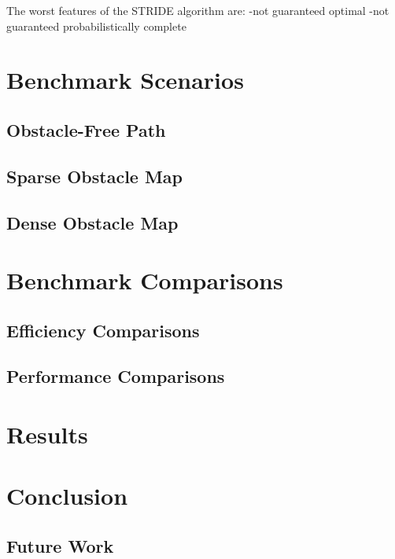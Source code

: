 \documentclass[conference]{IEEEtran} \usepackage[T1]{fontenc} \usepackage[backend=biber, style=ieee]{biblatex}
\begin{document}
The worst features of the STRIDE algorithm are:
-not guaranteed optimal
-not guaranteed probabilistically complete


\section{Benchmark Scenarios} \label{Benchmark Scenarios}

\subsection{Obstacle-Free Path} \label{Obstacle-free Path}

\subsection{Sparse Obstacle Map} \label{Sparse Obstacle Map}

\subsection{Dense Obstacle Map} \label{Dense Obstacle Map}

\section{Benchmark Comparisons} \label{Benchmark Comparison}

\subsection{Efficiency Comparisons} \label{Efficiency Comparisons}

\subsection{Performance Comparisons} \label{Performance Comparisons}

\section{Results} \label{Results}

\section{Conclusion} \label{Conclusion}

\subsection{Future Work}

\printbibliography
\end{document}
